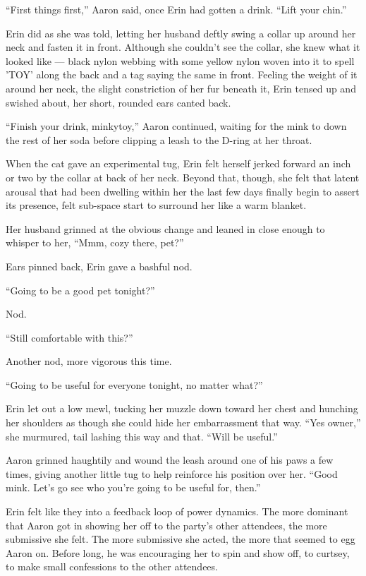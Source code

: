 \documentclass[12pt,letterpaper,oneside]{memoir}
\begin{document}
  ``First things first,'' Aaron said, once Erin had gotten a drink. ``Lift your chin.''

  Erin did as she was told, letting her husband deftly swing a collar up around her neck and fasten it in front. Although she couldn't see the collar, she knew what it looked like --- black nylon webbing with some yellow nylon woven into it to spell 'TOY' along the back and a tag saying the same in front. Feeling the weight of it around her neck, the slight constriction of her fur beneath it, Erin tensed up and swished about, her short, rounded ears canted back.

  ``Finish your drink, minkytoy,'' Aaron continued, waiting for the mink to down the rest of her soda before clipping a leash to the D-ring at her throat.

  When the cat gave an experimental tug, Erin felt herself jerked forward an inch or two by the collar at back of her neck. Beyond that, though, she felt that latent arousal that had been dwelling within her the last few days finally begin to assert its presence, felt sub-space start to surround her like a warm blanket.

  Her husband grinned at the obvious change and leaned in close enough to whisper to her, ``Mmm, cozy there, pet?''

  Ears pinned back, Erin gave a bashful nod.

  ``Going to be a good pet tonight?''

  Nod.

  ``Still comfortable with this?''

  Another nod, more vigorous this time.

  ``Going to be useful for everyone tonight, no matter what?''

  Erin let out a low mewl, tucking her muzzle down toward her chest and hunching her shoulders as though she could hide her embarrassment that way. ``Yes owner,'' she murmured, tail lashing this way and that. ``Will be useful.''

  Aaron grinned haughtily and wound the leash around one of his paws a few times, giving another little tug to help reinforce his position over her. ``Good mink. Let's go see who you're going to be useful for, then.''

  Erin felt like they into a feedback loop of power dynamics. The more dominant that Aaron got in showing her off to the party's other attendees, the more submissive she felt. The more submissive she acted, the more that seemed to egg Aaron on. Before long, he was encouraging her to spin and show off, to curtsey, to make small confessions to the other attendees.
\end{document}
